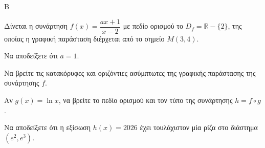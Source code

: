 \begin{thema}{Β}

Δίνεται η συνάρτηση $f(x) = \dfrac{a x + 1}{x - 2}$ με πεδίο ορισμού το $D_f = \mathbb{R} - \{2\}$, της οποίας η γραφική παράσταση διέρχεται από το σημείο $M(3, 4)$. 
\begin{erwthma}
\item Να αποδείξετε ότι $a = 1$.
\item Να βρείτε τις κατακόρυφες και οριζόντιες ασύμπτωτες της γραφικής παράστασης της συνάρτησης $f$.
\item Αν $g(x) = \ln x$, να βρείτε το πεδίο ορισμού και τον τύπο της συνάρτησης $h = f \circ g$.
\item Να αποδείξετε ότι η εξίσωση $h(x) = 2026$ έχει τουλάχιστον μία ρίζα στο διάστημα $(e^2, e^3)$.
\end{erwthma}
\end{thema}
